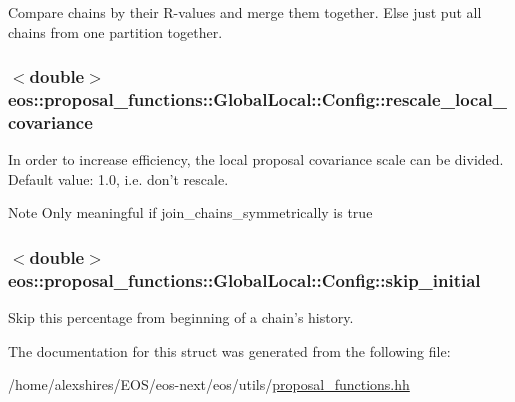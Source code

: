 \label{structeos_1_1proposal__functions_1_1GlobalLocal_1_1Config_a42bdc4d80a759f9daab15d01b0edf4b6}
Compare chains by their R-\/values and merge them together. Else just put all chains from one partition together. \hypertarget{structeos_1_1proposal__functions_1_1GlobalLocal_1_1Config_a70f82cec4c0a992cf70a53c771e89c9d}{
\subsubsection[{rescale\_\-local\_\-covariance}]{$<$double$>$ {\bf eos::proposal\_\-functions::GlobalLocal::Config::rescale\_\-local\_\-covariance}}}
\label{structeos_1_1proposal__functions_1_1GlobalLocal_1_1Config_a70f82cec4c0a992cf70a53c771e89c9d}
In order to increase efficiency, the local proposal covariance scale can be divided. Default value: 1.0, i.e. don't rescale. \begin{DoxyNote}{Note}
Only meaningful if join\_\-chains\_\-symmetrically is true 
\end{DoxyNote}
\hypertarget{structeos_1_1proposal__functions_1_1GlobalLocal_1_1Config_aa325beb2f96d399f28841ee802fb5584}{
\subsubsection[{skip\_\-initial}]{$<$double$>$ {\bf eos::proposal\_\-functions::GlobalLocal::Config::skip\_\-initial}}}
\label{structeos_1_1proposal__functions_1_1GlobalLocal_1_1Config_aa325beb2f96d399f28841ee802fb5584}


Skip this percentage from beginning of a chain's history. 

The documentation for this struct was generated from the following file:\begin{DoxyCompactItemize}
\item 
/home/alexshires/EOS/eos-\/next/eos/utils/\hyperlink{proposal__functions_8hh}{proposal\_\-functions.hh}\end{DoxyCompactItemize}
